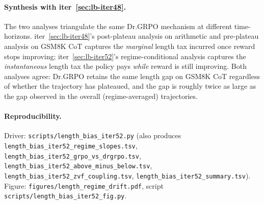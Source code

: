 \paragraph{Synthesis with iter~\ref{sec:lb-iter48}.}
The two analyses triangulate the same Dr.GRPO mechanism at different
time-horizons. iter~\ref{sec:lb-iter48}'s post-plateau analysis on
arithmetic and pre-plateau analysis on GSM8K CoT captures the
\emph{marginal} length tax incurred once reward stops improving;
iter~\ref{sec:lb-iter52}'s regime-conditional analysis captures the
\emph{instantaneous} length tax the policy pays \emph{while} reward is
still improving. Both analyses agree: Dr.GRPO retains the same length
gap on GSM8K CoT regardless of whether the trajectory has plateaued,
and the gap is roughly twice as large as the gap observed in the
overall (regime-averaged) trajectories.

\paragraph{Reproducibility.}
Driver: \texttt{scripts/length\_bias\_iter52.py} (also produces
\texttt{length\_bias\_iter52\_regime\_slopes.tsv},
\texttt{length\_bias\_iter52\_grpo\_vs\_drgrpo.tsv},
\texttt{length\_bias\_iter52\_above\_minus\_below.tsv},
\texttt{length\_bias\_iter52\_zvf\_coupling.tsv},
\texttt{length\_bias\_iter52\_summary.tsv}).
Figure: \texttt{figures/length\_regime\_drift.pdf},
script \texttt{scripts/length\_bias\_iter52\_fig.py}.
